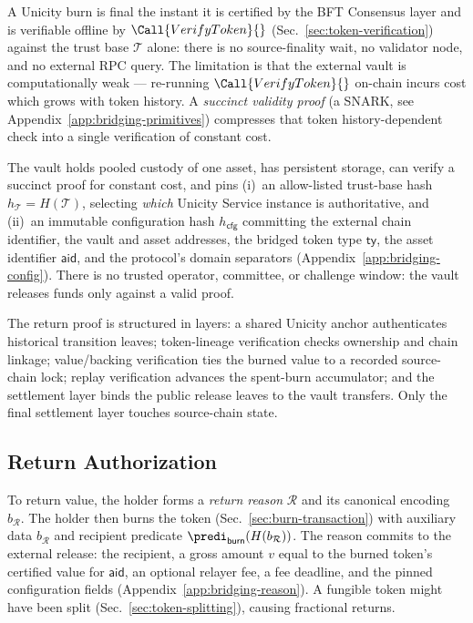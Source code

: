 A Unicity burn is final the instant it is certified by the BFT Consensus layer and is verifiable offline by $\Call{VerifyToken}{}$ (Sec.~\ref{sec:token-verification}) against the trust base $\mathcal{T}$ alone: there is no source-finality wait, no validator node, and no external RPC query. The limitation is that the external vault is computationally weak --- re-running $\Call{VerifyToken}{}$ on-chain incurs cost which grows with token history. A \emph{succinct validity proof} (a SNARK, see Appendix~\ref{app:bridging-primitives}) compresses that token history-dependent check into a single verification of constant cost.

The vault holds pooled custody of one asset, has persistent storage, can verify a succinct proof for constant cost, and pins (i)~an allow-listed trust-base hash $h_\mathcal{T} = H(\mathcal{T})$, selecting \emph{which} Unicity Service instance is authoritative, and (ii)~an immutable configuration hash $h_\mathsf{cfg}$ committing the external chain identifier, the vault and asset addresses, the bridged token type $\mathsf{ty}$, the asset identifier $\mathsf{aid}$, and the protocol's domain separators (Appendix~\ref{app:bridging-config}). There is no trusted operator, committee, or challenge window: the vault releases funds only against a valid proof.

The return proof is structured in layers: a shared Unicity anchor authenticates historical transition leaves; token-lineage verification checks ownership and chain linkage; value/backing verification ties the burned value to a recorded source-chain lock; replay verification advances the spent-burn accumulator; and the settlement layer binds the public release leaves to the vault transfers. Only the final settlement layer touches source-chain state.

\subsection{Return Authorization}\label{sec:bridge-return-reason}

To return value, the holder forms a \emph{return reason} $\mathcal{R}$ and its canonical encoding $b_\mathcal{R}$. The holder then burns the token (Sec.~\ref{sec:burn-transaction}) with auxiliary data $b_\mathcal{R}$ and recipient predicate $\predi_\mathsf{burn}(H(b_\mathcal{R}))$. The reason commits to the external release: the recipient, a gross amount $v$ equal to the burned token's certified value for $\mathsf{aid}$, an optional relayer fee, a fee deadline, and the pinned configuration fields (Appendix~\ref{app:bridging-reason}). A fungible token might have been split (Sec.~\ref{sec:token-splitting}), causing fractional returns.


